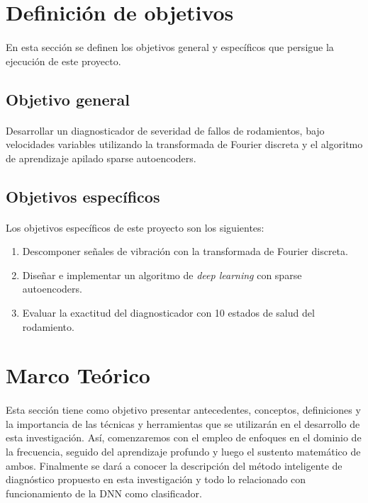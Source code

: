 \documentclass[a4paper,12pt]{article}
\begin{document}
\newpage
\section{Definición de objetivos}
\paragraph{}
En esta sección se definen los objetivos general y específicos que persigue la ejecución de este proyecto.
\subsection{Objetivo general}
\paragraph{}
Desarrollar un diagnosticador de severidad de fallos de rodamientos, bajo velocidades variables utilizando la transformada de Fourier discreta y el algoritmo de aprendizaje apilado sparse autoencoders.

\subsection{Objetivos específicos}
\paragraph{}
Los objetivos específicos de este proyecto son los siguientes:
\begin{enumerate}
\item{Descomponer señales de vibración con la transformada de Fourier discreta.}
\item{Diseñar e implementar un algoritmo de \textit{deep learning} con sparse autoencoders.}
\item{Evaluar la exactitud del diagnosticador con 10 estados de salud del rodamiento.}
\end{enumerate}

\section{Marco Teórico}
\paragraph{}
Esta sección tiene como objetivo presentar antecedentes, conceptos, definiciones y la importancia de las técnicas y herramientas que se utilizarán en el desarrollo de esta investigación. Así, comenzaremos con el empleo de enfoques en el dominio de la frecuencia, seguido del aprendizaje profundo y luego el sustento matemático de ambos. Finalmente se dará a conocer la descripción del método inteligente de diagnóstico propuesto en esta investigación y todo lo relacionado con funcionamiento de la DNN como clasificador.
\end{document}
